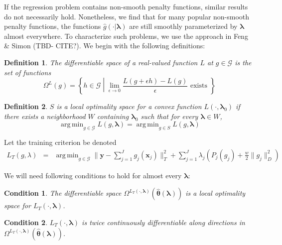 \documentclass[12pt]{article}
\newtheorem{definition}{Definition}
\newtheorem{condition}{Condition}
\DeclareMathOperator*{\argmin}{arg\,min}
\begin{document}
If the regression problem contains non-smooth penalty functions, similar results do not necessarily hold. Nonetheless, we find that for many popular non-smooth penalty functions, the functions $\hat{g}(\cdot | \boldsymbol \lambda)$ are still smoothly parameterized by $\boldsymbol \lambda$ almost everywhere. To characterize such problems, we use the approach in Feng \& Simon (TBD- CITE?). We begin with the following definitions:

\begin{definition}
The differentiable space of a real-valued function $L$ at $g \in \mathcal{G}$ is the set of functions
\begin{equation}
\Omega^{L}(g) = \left \{ h \in \mathcal{G} \middle | \lim_{\epsilon \rightarrow 0} \frac{L(g + \epsilon h) - L(g)}{\epsilon} \text{ exists } \right \}
\end{equation}
\end{definition}

\begin{definition}
$S$ is a local optimality space for a convex function $L(\cdot, \boldsymbol \lambda_0)$ if there exists a neighborhood $W$ containing $\boldsymbol \lambda_0$ such that for every $\boldsymbol \lambda \in W$,
\begin{equation}
\argmin_{g \in \mathcal{G}} L(g, \boldsymbol \lambda) =
\argmin_{g \in S} L(g, \boldsymbol \lambda)
\end{equation}
\end{definition}

Let the training criterion be denoted
\begin{eqnarray*}
L_T(g, \lambda) &=& \argmin_{g\in \mathcal{G}} \| \boldsymbol y -  \sum_{j=1}^J g_j(\boldsymbol x_j) \|^2_T + \sum_{j=1}^J \lambda_j \left ( P_j(g_j) + \frac{w}{2} \| g_j \|^2_D \right )
\end{eqnarray*}

We will need following conditions to hold for almost every $\boldsymbol{\lambda}$:
\begin{condition}
\label{condn:nonsmooth1}
The differentiable space $\Omega^{L_T(\cdot, \boldsymbol{\lambda})}(\hat{\boldsymbol \theta}\left(\boldsymbol{\lambda}\right))$ is a local optimality space for $L_T\left(\cdot,\boldsymbol{\lambda}\right)$.
\end{condition}
\begin{condition}
\label{condn:nonsmooth2}
$L_T(\cdot, \boldsymbol{\lambda})$ is twice continuously differentiable along directions in $\Omega^{L_T(\cdot, \boldsymbol{\lambda})}(\hat{\boldsymbol \theta}\left(\boldsymbol{\lambda}\right))$.
\end{condition}
\end{document}
